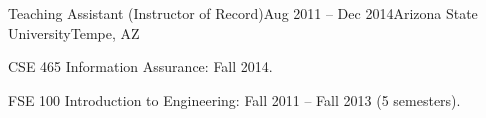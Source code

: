 
\def\PositionTitle{Teaching Assistant (Instructor of Record)}
\def\PositionPeriod{Aug 2011 -- Dec 2014} %
\def\OrgName{Arizona State University}
\def\OrgLocation{Tempe, AZ}


\begin{rExperience}{\PositionTitle}{\PositionPeriod}{\OrgName}{\OrgLocation}

  \item CSE 465 Information Assurance: Fall 2014.

  \item FSE 100 Introduction to Engineering: Fall 2011 -- Fall 2013 (5 semesters).

\end{rExperience}
